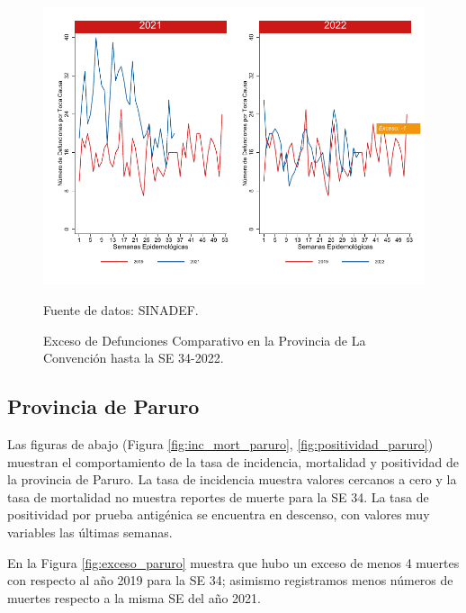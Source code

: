 \documentclass[12pt,a4paper,openany]{book}
\begin{document}
	\begin{figure}[h]
		\caption{Exceso de Defunciones Comparativo en la Provincia de La Convención hasta la SE 34-2022.}\label{fig:exceso_laconv}
		\begin{center}
			\includegraphics[width=0.7\linewidth]{../figuras/exceso_9.pdf}
		\end{center}
		{\footnotesize {Fuente de datos: SINADEF.}}
	\end{figure}
	
	\clearpage
	
	\subsection*{Provincia de Paruro}
	\noindent Las figuras de abajo (Figura \ref{fig:inc_mort_paruro}, \ref{fig:positividad_paruro}) muestran el comportamiento de la tasa de incidencia, mortalidad y positividad de la provincia de Paruro. La tasa de incidencia muestra valores cercanos a cero y la tasa de mortalidad no muestra reportes de muerte para la SE 34. La tasa de positividad por prueba antigénica se encuentra en descenso, con valores muy variables las últimas semanas.
	
	En la Figura \ref{fig:exceso_paruro} muestra que hubo un exceso de menos 4 muertes con respecto al año 2019 para la SE 34; asimismo registramos menos números de muertes respecto a la misma SE del año 2021.
	
\end{document}
